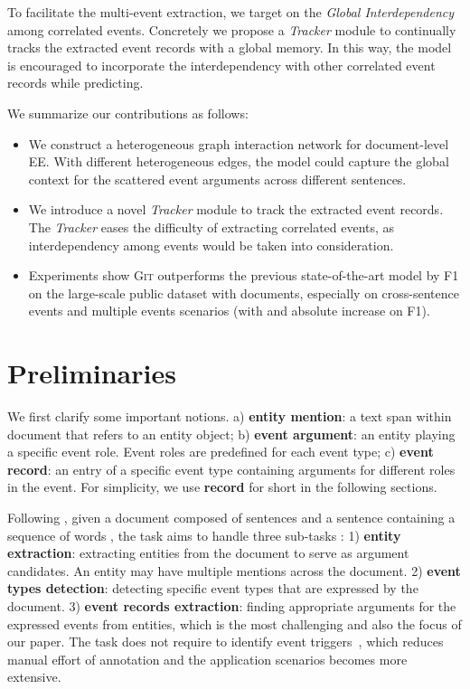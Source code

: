 \documentclass[11pt,a4paper]{article}
\newcommand{\modelname}{\textsc{Git}\xspace}
\begin{document}
To facilitate the multi-event extraction, we target on the \emph{Global Interdependency} among correlated events.
Concretely we propose a \textit{Tracker} module to continually tracks the extracted event records with a global memory. 
In this way, the model is encouraged to incorporate the interdependency with other correlated event records while predicting.


We summarize our contributions as follows:
\begin{itemize}
    \item We construct a heterogeneous graph interaction network for document-level EE. 
    With different heterogeneous edges,
    the model could capture the global context for the scattered event arguments across different sentences.
    \item We introduce a novel \textit{Tracker} module to track the extracted event records. The \textit{Tracker} eases the difficulty of extracting correlated events, as interdependency among events would be taken into consideration.
    \item Experiments show \modelname outperforms the previous state-of-the-art model by  F1 on the large-scale public dataset \citep{zheng-etal-2019-doc2edag} with  documents, especially on cross-sentence events and multiple events scenarios (with  and  absolute increase on F1).
\end{itemize}

 \section{Preliminaries}
We first clarify some important notions. 
a) \textbf{entity mention}: a text span within document that refers to an entity object; 
b) \textbf{event argument}: an entity playing a specific event role. Event roles are predefined for each event type;
c) \textbf{event record}: an entry of a specific event type containing arguments for different roles in the event. For simplicity, we use \textbf{record} for short in the following sections.


Following \citet{zheng-etal-2019-doc2edag}, given a document composed of sentences  and a sentence containing a sequence of words , the task aims to handle three sub-tasks : 
1) \textbf{entity extraction}: extracting entities  from the document to serve as argument candidates. 
An entity may have multiple mentions across the document.
2) \textbf{event types detection}: detecting specific event types that are expressed by the document.
3) \textbf{event records extraction}: finding appropriate arguments for the expressed events from entities, which is the most challenging and also the focus of our paper.
The task does not require to identify event triggers~\citep{DBLP:conf/aaai/ZengFMWYSZ18, liu-etal-2019-event}, which reduces manual effort of annotation and the application scenarios becomes more extensive.
\end{document}
